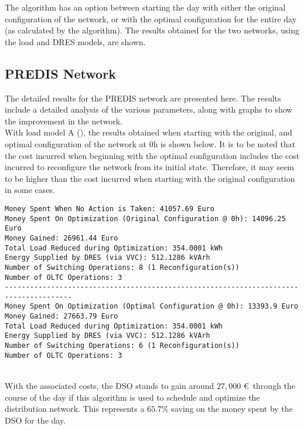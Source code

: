 The algorithm has an option between starting the day with either the original configuration of the network, or with the optimal configuration for the entire day (as calculated by the algorithm). The results obtained for the two networks, using the load and DRES models, are shown.

\subsection{PREDIS Network}

The detailed results for the PREDIS network are presented here. The results include a detailed analysis of the various parameters, along with graphs to show the improvement in the network.\\

With load model A (), the results obtained when starting with the original, and optimal configuration of the network at $0$h is shown below. It is to be noted that the cost incurred when beginning with the optimal configuration includes the cost incurred to reconfigure the network from its initial state. Therefore, it may seem to be higher than the cost incurred when starting with the original configuration in some cases.

\begin{lstlisting}[title=Console Output With Load Model A]
Money Spent When No Action is Taken: 41057.69 Euro
Money Spent On Optimization (Original Configuration @ 0h): 14096.25 Euro
Money Gained: 26961.44 Euro
Total Load Reduced during Optimization: 354.0001 kWh
Energy Supplied by DRES (via VVC): 512.1286 kVArh
Number of Switching Operations: 8 (1 Reconfiguration(s))
Number of OLTC Operations: 3
--------------------------------------------------------------------------------------
Money Spent On Optimization (Optimal Configuration @ 0h): 13393.9 Euro
Money Gained: 27663.79 Euro
Total Load Reduced during Optimization: 354.0001 kWh
Energy Supplied by DRES (via VVC): 512.1286 kVArh
Number of Switching Operations: 6 (1 Reconfiguration(s))
Number of OLTC Operations: 3
\end{lstlisting}
\ \\
With the associated costs, the DSO stands to gain around $27,000$ \euro\ through the course of the day if this algorithm is used to schedule and optimize the distribution network. This represents a $65.7$\% saving on the money spent by the DSO for the day.\\

